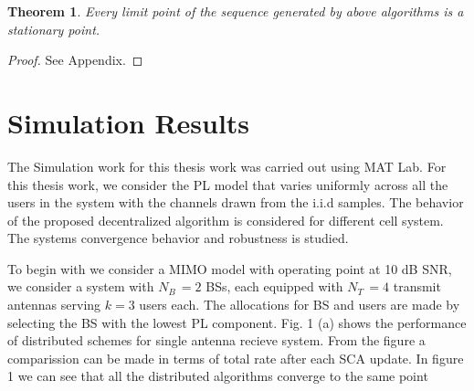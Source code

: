 \documentclass[a4paper, 12pt,titlepage]{dithesis} %
\newtheorem{theorem}{Theorem}
\newcommand{\me}[1]{\( #1 \)}
\begin{document}
\newpage
\begin{theorem}
Every limit point of the sequence generated by above algorithms is a stationary point.
\end{theorem}
\begin{proof}
See Appendix.
\end{proof}	

\chapter{\huge Simulation Results}

The Simulation work for this thesis work was carried out using MAT Lab. For this thesis work, we consider the \ac{PL} model that varies uniformly across all the users in the system with the channels drawn from the i.i.d samples. The behavior of the proposed decentralized algorithm is considered for different cell system. The systems convergence behavior and robustness is studied. 

To begin with we consider a \ac{MIMO} model with operating point at 10 dB \ac{SNR}, we consider a system with \me{N_B \, = 2} \ac{BS}s, each equipped with \me{N_T\, = 4} transmit antennas serving \me{k = 3} users each. The allocations for \ac{BS} and users are made by selecting the \ac{BS} with the lowest \ac{PL} component. Fig. 1 (a) shows the  performance of distributed schemes for single antenna recieve system. From the figure a comparission can be made in terms of total rate after each \ac{SCA} update. In figure 1 we can see that all the distributed algorithms converge to the same point
\end{document}
